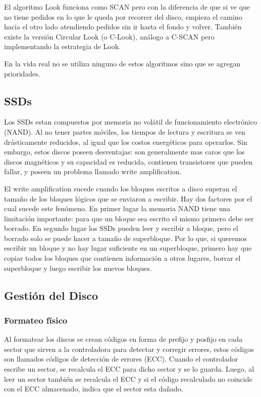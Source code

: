 \documentclass{article}
\begin{document}
El algoritmo Look funciona como SCAN pero con la diferencia de que si ve que no tiene pedidos en lo que le queda por recorrer del disco, empieza el camino hacia el otro lado atendiendo pedidos sin ir hasta el fondo y volver. Tambi\'en existe la versi\'on Circular Look (o C-Look), análogo a C-SCAN pero implementando la estrategia de Look.

En la vida real no se utiliza ninguno de estos algoritmos sino que se agregan prioridades.

\subsection{SSDs}

Los SSDs estan compuestos por memoria no volátil de funcionamiento electrónico (NAND). Al no tener partes móviles, los tiempos de lectura y escritura se ven drásticamente reducidos, al igual que los costos energéticos para operarlos. Sin embargo, estos discos poseen desventajas: son generalmente mas caros que los discos magnéticos y su capacidad es reducida, contienen transistores que pueden fallar, y poseen un problema llamado write amplification. 

El write amplification sucede cuando los bloques escritos a disco superan el tamaño de los bloques lógicos que se enviaron a escribir. Hay dos factores por el cual sucede este fenómeno. En primer lugar la memoria NAND tiene una limitación importante: para que un bloque sea escrito el mismo primero debe ser borrado. En segundo lugar los SSDs pueden leer y escribir a bloque, pero el borrado solo se puede hacer a tamaño de superbloque. Por lo que, si queremos escribir un bloque y no hay lugar suficiente en un superbloque, primero hay que copiar todos los bloques que contienen información a otros lugares, borrar el superbloque y luego escribir los nuevos bloques.

\subsection{Gesti\'on del Disco}

\subsubsection{Formateo f\'isico}

Al formatear los discos se crean c\'odigos en forma de prefijo y posfijo en cada sector que sirven a la controladora para detectar y corregir errores, estos códigos son llamados códigos de detección de errores (ECC). Cuando el controlador escribe un sector, se recalcula el ECC para dicho sector y se lo guarda. Luego, al leer un sector también se recalcula el ECC y si el código recalculado no coincide con el ECC almacenado, indica que el sector esta dañado.
\end{document}
